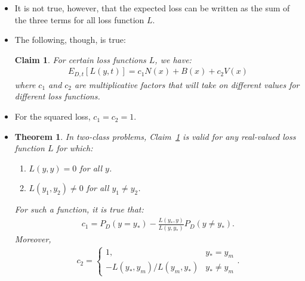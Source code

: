 \documentclass[10pt]{article}
\newtheorem{theorem}[lemma]{Theorem}
\newtheorem{claim}[lemma]{Claim}
\begin{document}
  \begin{itemize}
    \item It is not true, however, that the expected loss can be written as the sum of the three terms for all loss function $L$.

    \item The following, though, is true:
    \begin{claim} \label{bv-decomp}
      For certain loss functions $L$, we have:
      \begin{align}
        E_{D,t}[L(y,t)] = c_1 N(x) + B(x) + c_2 V(x) \label{bias-variance-decomp}
      \end{align}
      where $c_1$ and $c_2$ are multiplicative factors that will take on different values for different loss functions.
    \end{claim}

    \item For the squared loss, $c_1 = c_2 = 1$.

    \item \begin{theorem} \label{two-class-decomp}
      In two-class problems, Claim~\ref{bv-decomp} is valid for any real-valued loss function $L$ for which:
      \begin{enumerate}
        \item $L(y,y) = 0$ for all $y$.
        \item $L(y_1, y_2) \neq 0$ for all $y_1 \neq y_2$.        
      \end{enumerate}
      For such a function, it is true that:
      \begin{align*}
        c_1 = P_D(y = y_*) - \frac{L(y_*, y)}{L(y,y_*)} P_D(y \neq y_*).
      \end{align*}
      Moreover,
      \begin{align*}
        c_2 = \begin{cases}
          1, & y_* = y_m \\
          -L(y_*, y_m) / L(y_m, y_*) & y_* \neq y_m
        \end{cases}.
      \end{align*}
    \end{theorem}


\end{itemize}
\end{document}
